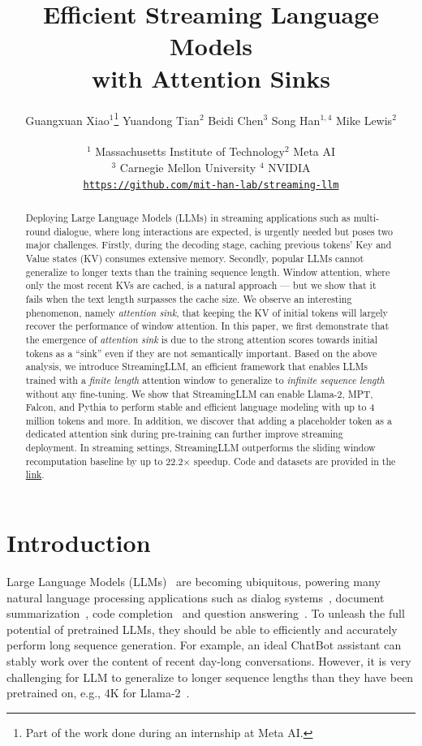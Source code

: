 \documentclass{article} \usepackage{iclr2024_conference,times}
\title{Efficient Streaming Language Models \\ with Attention Sinks}
\author{
Guangxuan Xiao$^{1}$\thanks{Part of the work done during an internship at Meta AI.} \quad Yuandong Tian$^2$ \quad Beidi Chen$^3$ \quad Song Han$^{1,4}$ \quad Mike Lewis$^2$ \\
\\ $^1$ Massachusetts Institute of Technology\quad $^2$ Meta AI
\\ $^3$ Carnegie Mellon University \quad $^4$ NVIDIA
\\ \texttt{\url{https://github.com/mit-han-lab/streaming-llm}}
}
\def\method{StreamingLLM\xspace}
\begin{document}
\maketitle

\begin{abstract}
Deploying Large Language Models (LLMs) in streaming applications such as multi-round dialogue, where long interactions are expected, is urgently needed but poses two major challenges.
Firstly, during the decoding stage, caching previous tokens' Key and Value states (KV) consumes extensive memory.
Secondly, popular LLMs cannot generalize to longer texts than the training sequence length.
Window attention, where only the most recent KVs are cached, is a natural approach --- but we show that it fails when the text length surpasses the cache size.
We observe an interesting phenomenon, namely \emph{attention sink}, that keeping the KV of initial tokens will largely recover the performance of window attention. In this paper, we first demonstrate that the emergence of \emph{attention sink} is due to the strong attention scores towards initial tokens as a ``sink'' even if they are not semantically important.
Based on the above analysis, we introduce \method, an efficient framework that enables LLMs trained with a \textit{finite length} attention window to generalize to \textit{infinite sequence length} without any fine-tuning.
We show that \method can enable Llama-2, MPT, Falcon, and Pythia to perform stable and efficient language modeling with up to 4 million tokens and more.
In addition, we discover that adding a placeholder token as a dedicated attention sink during pre-training can further improve streaming deployment. In streaming settings, \method outperforms the sliding window recomputation baseline by up to 22.2$\times$ speedup.
Code and datasets are provided in the \href{https://github.com/mit-han-lab/streaming-llm}{link}.
\end{abstract}
 \section{Introduction}
Large Language Models (LLMs)~\citep{radford2018improving,brown2020language,zhang2022opt,openai2023gpt4,touvron2023llama,touvron2023llama2} are becoming ubiquitous, powering many natural language processing applications such as dialog systems~\citep{schulman2022chatgpt,alpaca,vicuna2023}, document summarization~\citep{goyal-durrett-2020-evaluating,zhang2023benchmarking}, code completion~\citep{chen2021evaluating,rozière2023code}  and question answering~\citep{kamalloo2023evaluating}. To unleash the full potential of pretrained LLMs, they should be able to efficiently and accurately perform long sequence generation. For example, an ideal ChatBot assistant can stably work over the content of recent day-long conversations. However, it is very challenging for LLM to generalize to longer sequence lengths than they have been pretrained on, e.g., 4K for Llama-2~\cite{touvron2023llama2}. 
\end{document}
